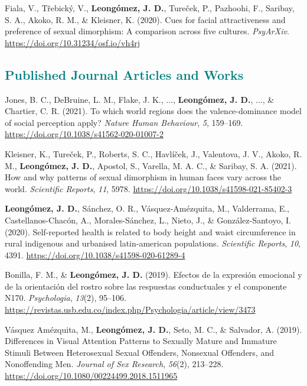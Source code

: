 \documentclass[11pt, a4paper]{awesome-cv}
\begin{document}
\leavevmode\hypertarget{ref-Fiala2020}{}%
Fiala, V., Třebický, V., \textbf{Leongómez, J. D.}, Tureček, P.,
Pazhoohi, F., Saribay, S. A., Akoko, R. M., \& Kleisner, K. (2020). Cues
for facial attractiveness and preference of sexual dimorphism: {A}
comparison across five cultures. \emph{PsyArXiv}.
\url{https://doi.org/10.31234/osf.io/vh4rj}

\endgroup

\hypertarget{section-1}{%
\subsection{\texorpdfstring{\textcolor{teal}{Published Journal Articles and Works}}{}}\label{section-1}}

\begingroup
\setlength{\parindent}{-0.5in}
\setlength{\leftskip}{0.5in}

\hypertarget{refs_journals}{}
\leavevmode\hypertarget{ref-Jones2021}{}%
Jones, B. C., DeBruine, L. M., Flake, J. K., ...,
\textbf{Leongómez, J. D.}, ..., \& Chartier, C. R. (2021). {To which
world regions does the valence-dominance model of social perception
apply?} \emph{Nature Human Behaviour}, \emph{5}, 159--169.
\url{https://doi.org/10.1038/s41562-020-01007-2}

\leavevmode\hypertarget{ref-kleisner2021}{}%
Kleisner, K., Tureček, P., Roberts, S. C., Havlíček, J., Valentova, J.
V., Akoko, R. M., \textbf{Leongómez, J. D.}, Apostol, S., Varella, M. A.
C., \& Saribay, S. A. (2021). How and why patterns of sexual dimorphism
in human faces vary across the world. \emph{Scientific Reports},
\emph{11}, 5978. \url{https://doi.org/10.1038/s41598-021-85402-3}

\leavevmode\hypertarget{ref-Leonguxf3mez2020}{}%
\textbf{Leongómez, J. D.}, Sánchez, O. R., Vásquez-Amézquita, M.,
Valderrama, E., Castellanos-Chacón, A., Morales-Sánchez, L., Nieto, J.,
\& González-Santoyo, I. (2020). Self-reported health is related to body
height and waist circumference in rural indigenous and urbanised
latin-american populations. \emph{Scientific Reports}, \emph{10}, 4391.
\url{https://doi.org/10.1038/s41598-020-61289-4}

\leavevmode\hypertarget{ref-BonillaCarreno2019}{}%
Bonilla, F. M., \& \textbf{Leongómez, J. D.} (2019). {Efectos de la
expresi{ó}n emocional y de la orientaci{ó}n del rostro sobre las
respuestas conductuales y el componente N170}. \emph{Psychologia},
\emph{13}(2), 95--106.
\url{https://revistas.usb.edu.co/index.php/Psychologia/article/view/3473}

\leavevmode\hypertarget{ref-VasquezAmezquita2019}{}%
Vásquez Amézquita, M., \textbf{Leongómez, J. D.}, Seto, M. C., \&
Salvador, A. (2019). {Differences in Visual Attention Patterns to
Sexually Mature and Immature Stimuli Between Heterosexual Sexual
Offenders, Nonsexual Offenders, and Nonoffending Men}. \emph{Journal of
Sex Research}, \emph{56}(2), 213--228.
\url{https://doi.org/10.1080/00224499.2018.1511965}
\end{document}
